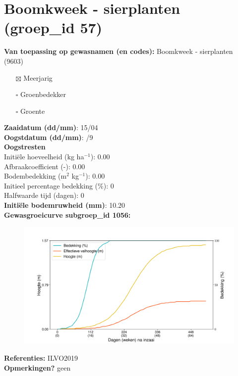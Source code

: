 \documentclass{article}
\begin{document}
 \section{Boomkweek - sierplanten (groep\_id 57)} 
 \textbf{Van toepassing op gewasnamen (en codes):} Boomkweek - sierplanten (9603) 
 \begin{multicols}{3} \begin{itemize} \item[$\boxtimes$] Meerjarig \item[$\square$] Groenbedekker \item[$\square$] Groente \end{itemize} \end{multicols} 
  \textbf{Zaaidatum (dd/mm)}: 15/04  \vspace{0.10cm} \\ 
  \textbf{Oogstdatum (dd/mm)}: /9  \vspace{0.10cm} \\ 
  \textbf{Oogstresten} \vspace{0.05cm} \\ 
  \tab Initi\"{e}le hoeveelheid (kg ha$^{-1}$): 0.00 \vspace{0.05cm} \\ 
  \tab Afbraakcoefficient (-): 0.00 \vspace{0.05cm} \\ 
  \tab Bodembedekking (m$^2$ kg$^{-1}$): 0.00 \vspace{0.05cm} \\ 
  \tab Initieel percentage bedekking (\%): 0 \vspace{0.05cm} \\ 
  \tab Halfwaarde tijd (dagen): 0 \vspace{0.05cm} \\ 
  \textbf{Initi\"{e}le bodemruwheid (mm)}: 10.20 \vspace{0.05cm} \\ 
  \textbf{Gewasgroeicurve subgroep\_id 1056:} 
 \begin{center} \begin{figure}[H] \includegraphics[width=12.5cm]{temp/1056.png} \end{figure} \end{center} 
  \textbf{Referenties:} ILVO2019 \vspace{0.10cm} \\ 
  \textbf{Opmerkingen?} geen \vspace{0.10cm} \\ 
 \newpage 
\end{document}
